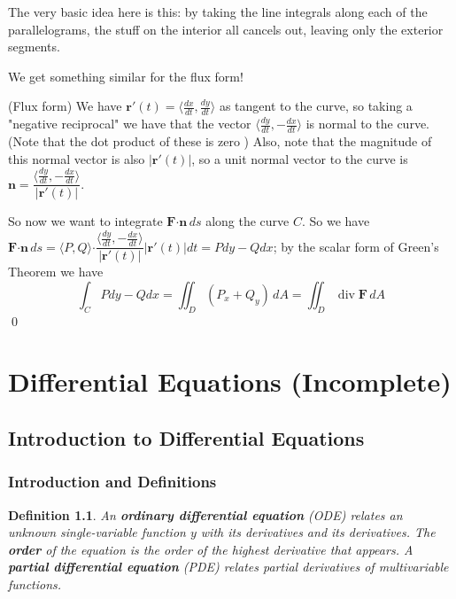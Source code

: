 \documentclass[letterpaper, 11pt, openany]{book}
\newcommand{\scdot}{\boldsymbol{\cdot}}
\newcommand{\divr}[1]{\operatorname{div}\mathbf{#1}}
\theoremstyle{mytheoremstyle}
\newtheorem{definition}{Definition}[section]
\renewenvironment{proof}{{\par \sffamily \smaller \fontseries{b}\selectfont Proof}}{\hfill\qed}
\theoremstyle{myexamplestyle}
\begin{document}
The very basic idea here is this: by taking the line integrals along each of the parallelograms, the stuff on the interior all cancels out, leaving only the exterior segments.

We get something similar for the flux form!

\begin{proof}
    (Flux form) We have \(\mathbf{r}'(t) = \langle \frac{dx}{dt}, \frac{dy}{dt}\rangle\) as tangent to the curve, so taking a "negative reciprocal" we have that the vector \(\langle \frac{dy}{dt}, -\frac{dx}{dt}\rangle\) is normal to the curve. (Note that the dot product of these is zero \faSmile) Also, note that the magnitude of this normal vector is also \(|\mathbf{r}'(t)|\), so a unit normal vector to the curve is \(\mathbf{n} = \dfrac{\langle \frac{dy}{dt}, -\frac{dx}{dt}\rangle}{|\mathbf{r}'(t)|}\).

    So now we want to integrate \(\mathbf{F} \scdot \mathbf{n} \, ds\) along the curve \(C\). So we have \(\mathbf{F} \scdot \mathbf{n} \, ds = \langle P, Q\rangle \scdot \dfrac{\langle \frac{dy}{dt}, -\frac{dx}{dt}\rangle}{|\mathbf{r}'(t)|}  |\mathbf{r}'(t)| dt = P dy - Q dx\); by the scalar form of Green's Theorem we have
    \[\int_{C} P dy - Q dx = \iint_{D} \left(P_x + Q_y\right)\, dA = \iint_{D} \divr{F} \, dA\]
\end{proof}


\newpage
\part{Differential Equations (Incomplete)}
\thispagestyle{firstofchapter}
\chapter{Introduction to Differential Equations}
\section{Introduction and Definitions}
\setcounter{figure}{0}
\begin{definition}\label{d:ODE-PDE}
    An \textbf{ordinary differential equation} (ODE) relates an unknown single-variable function \(y\) with its derivatives and its derivatives. The \textbf{order} of the equation is the order of the highest derivative that appears. A \textbf{partial differential equation} (PDE) relates partial derivatives of multivariable functions.
\end{definition}
\end{document}
